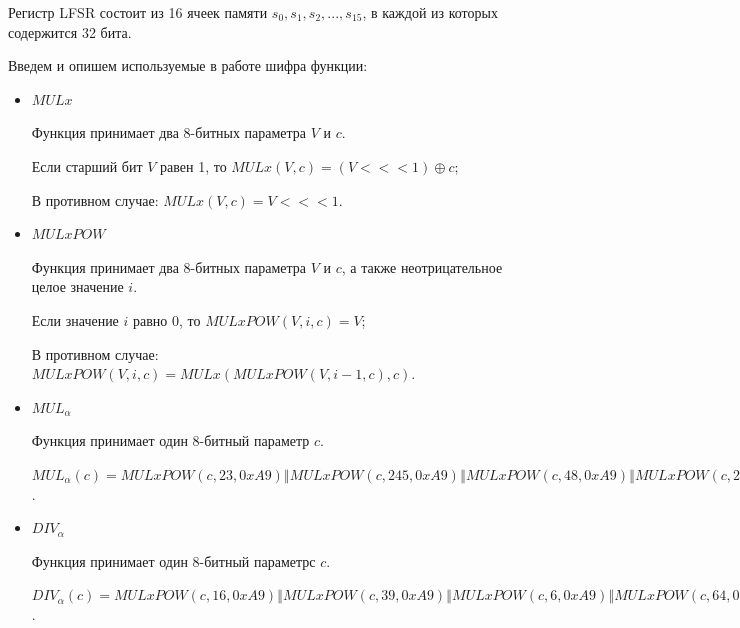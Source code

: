 \documentclass{./civarticle}
\begin{document}
Регистр LFSR состоит из 16 ячеек памяти $s_0, s_1, s_2, ..., s_{15}$, в каждой из которых содержится 32 бита.

Введем и опишем используемые в работе шифра функции:
\begin{itemize}
    \item $MULx$
    
    Функция принимает два 8-битных параметра $V$ и $c$.
    
    Если старший бит $V$ равен 1, то $MULx(V, c) = (V <<< 1) \oplus c$;
    
    В противном случае: $MULx(V, c) = V <<< 1$.

    \item $MULxPOW$

    Функция принимает два 8-битных параметра $V$ и $c$, а также неотрицательное целое значение $i$.

    Если значение $i$ равно 0, то $MULxPOW(V, i, c) = V$;

    В противном случае: $MULxPOW(V, i, c) = MULx(MULxPOW(V, i - 1, c), c)$.

    \item $MUL_\alpha$

    Функция принимает один 8-битный параметр $c$.

    $MUL_\alpha(c) = MULxPOW(c, 23, 0xA9) \mathbin\Vert MULxPOW(c, 245, 0xA9) \mathbin\Vert MULxPOW(c, 48, 0xA9) \mathbin\Vert MULxPOW(c, 239, 0xA9)$.

    \item $DIV_\alpha$

    Функция принимает один 8-битный параметрс $c$.

    $DIV_\alpha(c) = MULxPOW(c, 16, 0xA9) \mathbin\Vert MULxPOW(c, 39, 0xA9) \mathbin\Vert MULxPOW(c, 6, 0xA9) \mathbin\Vert MULxPOW(c, 64, 0xA9)$.
\end{itemize}
\end{document}
